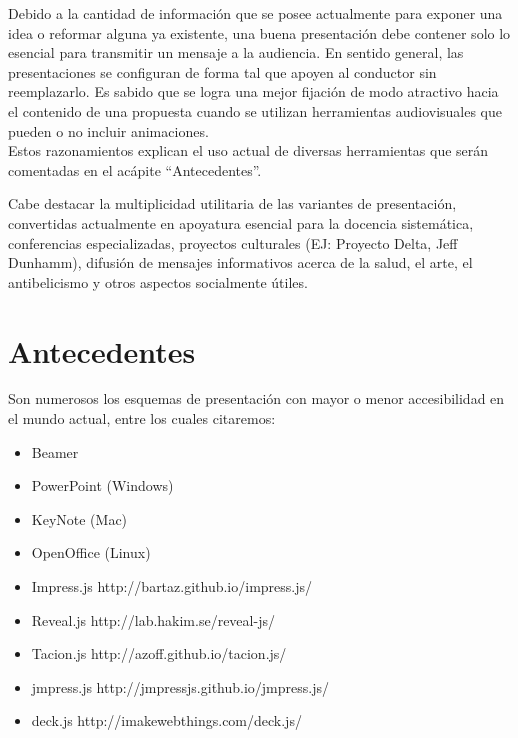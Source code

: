
\begin{introduction}

Debido a la cantidad de información que se posee actualmente para exponer una idea o reformar alguna ya existente, una buena presentación debe contener solo lo esencial para transmitir un mensaje a la audiencia. En sentido general, las presentaciones se configuran de forma tal que apoyen al conductor sin reemplazarlo. Es sabido que se logra una mejor fijación de modo atractivo hacia el contenido de una propuesta cuando se utilizan herramientas audiovisuales que pueden o no incluir animaciones.\\

Estos razonamientos explican el uso actual de diversas herramientas que serán comentadas en el acápite ``Antecedentes''.

Cabe destacar la multiplicidad utilitaria de las variantes de presentación, convertidas actualmente en apoyatura esencial para la docencia sistemática, conferencias especializadas, proyectos  culturales (EJ: Proyecto Delta, Jeff Dunhamm), difusión de mensajes informativos acerca de la salud, el arte, el antibelicismo y otros aspectos socialmente útiles.


\section*{Antecedentes}

Son numerosos los esquemas de presentación con mayor o menor accesibilidad en el mundo actual, entre los cuales citaremos:

\begin{itemize}
	\item Beamer
	\item PowerPoint (Windows)
	\item KeyNote (Mac)
	\item OpenOffice (Linux)
	\item Impress.js http://bartaz.github.io/impress.js/
	\item Reveal.js http://lab.hakim.se/reveal-js/
	\item Tacion.js http://azoff.github.io/tacion.js/ 
	\item jmpress.js http://jmpressjs.github.io/jmpress.js/ 
	\item deck.js http://imakewebthings.com/deck.js/
\end{itemize}


\end{introduction}
